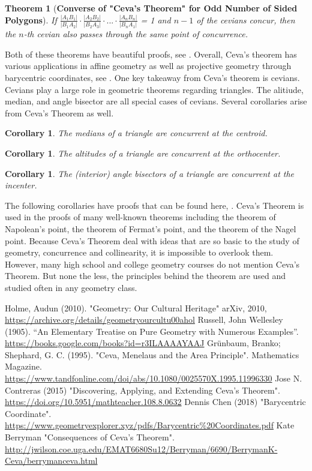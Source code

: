 \documentclass[12pt,a4paper,reqno,parskip=full]{amsart}
\numberwithin{equation}{section}
\theoremstyle{plain}
\newtheorem{theorem}[subsection]{Theorem}
\newtheorem{corollary}[subsection]{Corollary}
\theoremstyle{definition}
\begin{document}
\begin{theorem}[\textbf{Converse of "Ceva's Theorem" for Odd Number of Sided Polygons}]
If $\frac{|A_1B_1|}{|B_1A_2|}\cdot\frac{|A_2B_2|}{|B_2A_3|}\cdot...\cdot\frac{|A_nB_n|}{|B_nA_1|}$ = 1 and $n-1$ of the cevians concur, then the $n$-th cevian also passes through the same point of concurrence.
\end{theorem}

Both of these theorems have beautiful proofs, see \cite{4}. Overall, Ceva's theorem has various applications in affine geometry as well as projective geometry through barycentric coordinates, see \cite{5}. One key takeaway from Ceva's theorem is cevians. Cevians play a large role in geometric theorems regarding triangles. The alitiude, median, and angle bisector are all special cases of cevians. Several corollaries arise from Ceva's Theorem as well.

\begin{corollary}
The medians of a triangle are concurrent at the centroid.
\end{corollary}

\begin{corollary}
The altitudes of a triangle are concurrent at the orthocenter.
\end{corollary}

\begin{corollary}
The (interior) angle bisectors of a triangle are concurrent at the incenter.
\end{corollary}

The following corollaries have proofs that can be found here, \cite{6}. Ceva's Theorem is used in the proofs of many well-known theorems including the theorem of Napolean's point, the theorem of Fermat's point, and the theorem of the Nagel point. Because Ceva's Theorem deal with ideas that are so basic to the study of geometry, concurrence and collinearity, it is impossible to overlook them. However, many high school and college geometry courses do not mention Ceva's Theorem. But none the less, the principles behind the theorem are used and studied often in any geometry class.


\begin{thebibliography}{15}
 Holme, Audun (2010). "Geometry: Our Cultural Heritage" arXiv, 2010, \url{https://archive.org/details/geometryourcultu00ahol}
 Russell, John Wellesley (1905). “An Elementary Treatise on Pure Geometry with Numerous Examples”. \url{https://books.google.com/books?id=r3ILAAAAYAAJ}
 Grünbaum, Branko; Shephard, G. C. (1995). "Ceva, Menelaus and the Area Principle". Mathematics Magazine. \url{https://www.tandfonline.com/doi/abs/10.1080/0025570X.1995.11996330}
 Jose N. Contreras (2015) "Discovering, Applying, and Extending Ceva's Theorem". \url{https://doi.org/10.5951/mathteacher.108.8.0632}
 Dennis Chen (2018) "Barycentric Coordinate". \url{https://www.geometryexplorer.xyz/pdfs/Barycentric%20Coordinates.pdf}
 Kate Berryman "Consequences of Ceva's Theorem". \url{http://jwilson.coe.uga.edu/EMAT6680Su12/Berryman/6690/BerrymanK-Ceva/berrymanceva.html}

\end{thebibliography}
\end{document}
